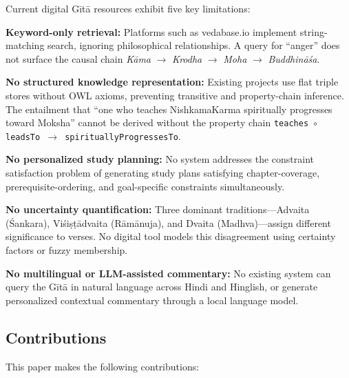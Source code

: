 \documentclass[conference]{IEEEtran}
\begin{document}
Current digital G\={i}t\={a} resources exhibit five key limitations:

\textbf{Keyword-only retrieval:} Platforms such as vedabase.io implement
string-matching search, ignoring philosophical relationships. A query for
``anger'' does not surface the causal chain
\textit{K\={a}ma} $\to$ \textit{Krodha} $\to$ \textit{Moha}
$\to$ \textit{Buddhin\={a}\'{s}a}.

\textbf{No structured knowledge representation:} Existing projects use flat
triple stores without OWL axioms, preventing transitive and property-chain
inference. The entailment that ``one who teaches NishkamaKarma spiritually
progresses toward Moksha'' cannot be derived without the property chain
\texttt{teaches $\circ$ leadsTo $\to$ spirituallyProgressesTo}.

\textbf{No personalized study planning:} No system addresses the constraint
satisfaction problem of generating study plans satisfying chapter-coverage,
prerequisite-ordering, and goal-specific constraints simultaneously.

\textbf{No uncertainty quantification:} Three dominant traditions—Advaita
(\'Sankara), Vi\'si\d{s}\d{t}\={a}dvaita (R\={a}m\={a}nuja), and Dvaita
(Madhva)—assign different significance to verses. No digital tool models this
disagreement using certainty factors or fuzzy membership.

\textbf{No multilingual or LLM-assisted commentary:} No existing system can
query the G\={i}t\={a} in natural language across Hindi and Hinglish, or
generate personalized contextual commentary through a local language model.

\subsection{Contributions}

This paper makes the following contributions:
\end{document}
